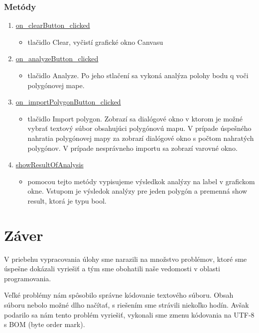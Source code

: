 \documentclass[12pt]{article}
\begin{document}
\subsubsection{Metódy}
\begin{enumerate}
\item[] \underline{on\_clearButton\_clicked}
\begin{itemize}
\item tlačidlo Clear, vyčistí grafické okno Canvasu
\end{itemize}
\item[] \underline{on\_analyzeButton\_clicked}
\begin{itemize}
\item tlačidlo Analyze. Po jeho stlačení sa vykoná analýza polohy bodu q voči polygónovej mape.
\end{itemize}
\item[] \underline{on\_importPolygonButton\_clicked}
\begin{itemize}
\item tlačidlo Import polygon. Zobrazí sa dialógové okno v ktorom je možné vybrať textový súbor obsahujúci polygónovú mapu. V prípade úspešného nahratia polygónovej mapy za zobrazí dialógové okno s počtom nahratých polygónov. V prípade nesprávneho importu sa zobrazí varovné okno.
\end{itemize}
\item[] \underline{showResultOfAnalysis}
\begin{itemize}
\item pomocou tejto metódy vypisujeme výsledkok analýzy na label v grafickom okne. Vstupom je výsledok analýzy pre jeden polygón a premenná show result, ktorá je typu bool.

\end{itemize}
\end{enumerate}


\section{Záver}
V priebehu vypracovania úlohy sme narazili na množstvo problémov, ktoré sme úspešne dokázali vyriešiť a tým sme obohatili naše vedomosti v oblasti programovania.

Veľké problémy nám spôsobilo správne kódovanie textového súboru. Obsah súboru nebolo možné dlho načítať, s riešením sme strávili niekoľko hodín. Avšak podarilo sa nám tento problém vyriešiť, vykonali sme zmenu kódovania na UTF-8 s BOM (byte order mark).
\end{document}
